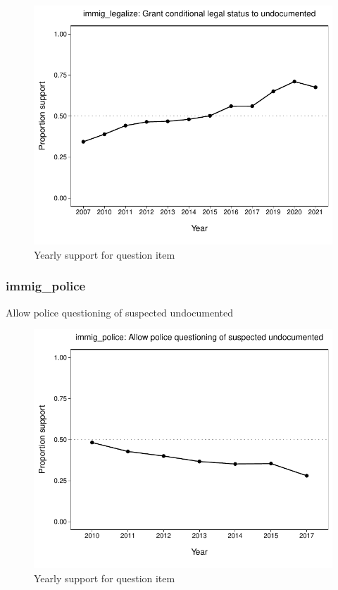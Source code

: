 \documentclass[
  12pt]{article}
\begin{document}
\begin{figure}

{\centering \includegraphics{error-checking_files/figure-latex/unnamed-chunk-3-23} 

}

\caption{Yearly support for question item}\label{fig:unnamed-chunk-3-23}
\end{figure}

\hypertarget{immig_police}{%
\subsubsection{immig\_police}\label{immig_police}}

Allow police questioning of suspected undocumented

\begin{figure}

{\centering \includegraphics{error-checking_files/figure-latex/unnamed-chunk-3-24} 

}

\caption{Yearly support for question item}\label{fig:unnamed-chunk-3-24}
\end{figure}
\end{document}

